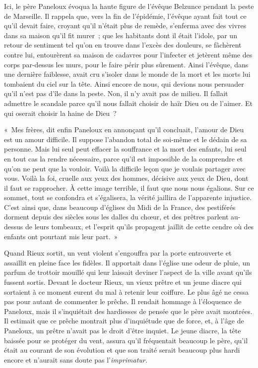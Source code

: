 \documentclass[french,twoside]{book} %
\begin{document}
Ici, le père Paneloux évoqua la haute figure de l’évêque Belzunce pendant la peste de Marseille. Il rappela que, vers la fin de l’épidémie, l’évêque ayant fait tout ce qu’il devait faire, croyant qu’il n’était plus de remède, s’enferma avec des vivres dans sa maison qu’il fit murer ; que les habitants dont il était l’idole, par un retour de sentiment tel qu’on en trouve dans l’excès des douleurs, se fâchèrent contre lui, entourèrent sa maison de cadavres pour l’infecter et jetèrent même des corps par-dessus les murs, pour le faire périr plus sûrement. Ainsi l’évêque, dans une dernière faiblesse, avait cru s’isoler dans le monde de la mort et les morts lui tombaient du ciel sur la tête. Ainsi encore de nous, qui devions nous persuader qu’il n’est pas d’île dans la peste. Non, il n’y avait pas de milieu. Il fallait admettre le scandale parce qu’il nous fallait choisir de haïr Dieu ou de l’aimer. Et qui oserait choisir la haine de Dieu ?\par
« Mes frères, dit enfin Paneloux en annonçant qu’il concluait, l’amour de Dieu est un amour difficile. Il suppose l’abandon total de soi-même et le dédain de sa personne. Mais lui seul peut effacer la souffrance et la mort des enfants, lui seul en tout cas la rendre nécessaire, parce qu’il est impossible de la comprendre et qu’on ne peut que la vouloir. Voilà la difficile leçon que je voulais partager avec vous. Voilà la foi, cruelle aux yeux des hommes, décisive aux yeux de Dieu, dont il faut se rapprocher. À cette image terrible, il faut que nous nous égalions. Sur ce sommet, tout se confondra et s’égalisera, la vérité jaillira de l’apparente injustice. C’est ainsi que, dans beaucoup d’églises du Midi de la France, des pestiférés dorment depuis des siècles sous les dalles du chœur, et des prêtres parlent au-dessus de leurs tombeaux, et l’esprit qu’ils propagent jaillit de cette cendre où des enfants ont pourtant mis leur part. »\par
Quand Rieux sortit, un vent violent s’engouffra par la porte entrouverte et assaillit en pleine face les fidèles. Il apportait dans l’église une odeur de pluie, un parfum de trottoir mouillé qui leur laissait deviner l’aspect de la ville avant qu’ils fussent sortis. Devant le docteur Rieux, un vieux prêtre et un jeune diacre qui sortaient à ce moment eurent du mal à retenir leur coiffure. Le plus âgé ne cessa pas pour autant de commenter le prêche. Il rendait hommage à l’éloquence de Paneloux, mais il s’inquiétait des hardiesses de pensée que le père avait montrées. Il estimait que ce prêche montrait plus d’inquiétude que de force, et, à l’âge de Paneloux, un prêtre n’avait pas le droit d’être inquiet. Le jeune diacre, la tête baissée pour se protéger du vent, assura qu’il fréquentait beaucoup le père, qu’il était au courant de son évolution et que son traité serait beaucoup plus hardi encore et n’aurait sans doute pas l’\emph{imprimatur.}\par
\end{document}
